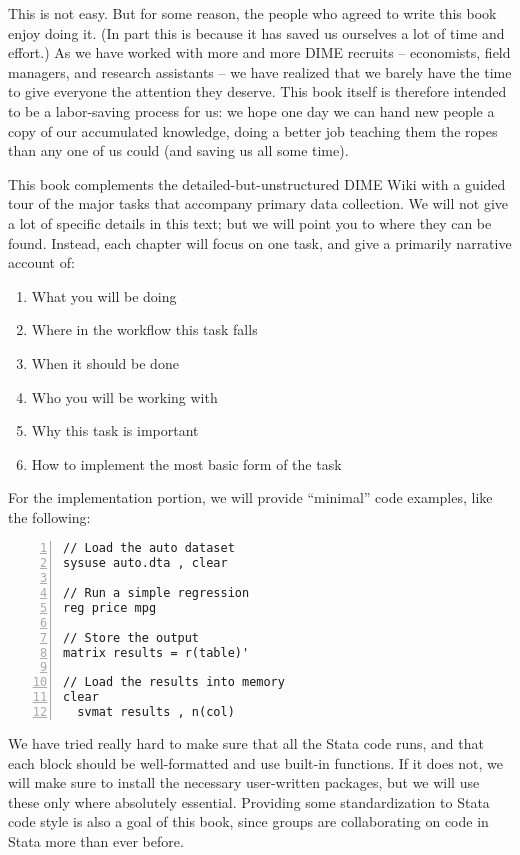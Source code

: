 This is not easy. But for some reason, the people who agreed to write this book enjoy doing it.
(In part this is because it has saved us ourselves a lot of time and effort.)
As we have worked with more and more DIME recruits -- economists, field managers, and research assistants --
we have realized that we barely have the time to give everyone the attention they deserve.
This book itself is therefore intended to be a labor-saving process for us:
we hope one day we can hand new people a copy of our accumulated knowledge,
doing a better job teaching them the ropes than any one of us could (and saving us all some time).

This book complements the detailed-but-unstructured DIME Wiki
with a guided tour of the major tasks that accompany primary data collection.
We will not give a lot of specific details in this text;
but we will point you to where they can be found.
Instead, each chapter will focus on one task, and give a primarily narrative account of:

\begin{enumerate}
  \item What you will be doing
  \item Where in the workflow this task falls
  \item When it should be done
  \item Who you will be working with
  \item Why this task is important
  \item How to implement the most basic form of the task
\end{enumerate}


For the implementation portion, we will provide ``minimal'' code examples, like the following:


\begin{Verbatim}[frame=lines,numbers=left,label=code.do]
// Load the auto dataset
sysuse auto.dta , clear

// Run a simple regression
reg price mpg

// Store the output
matrix results = r(table)'

// Load the results into memory
clear
  svmat results , n(col)
\end{Verbatim}

We have tried really hard to make sure that all the Stata code runs,
and that each block should be well-formatted and use built-in functions.
If it does not, we will make sure to install the necessary user-written packages,
but we will use these only where absolutely essential.
Providing some standardization to Stata code style is also a goal of this book,
since groups are collaborating on code in Stata more than ever before.

